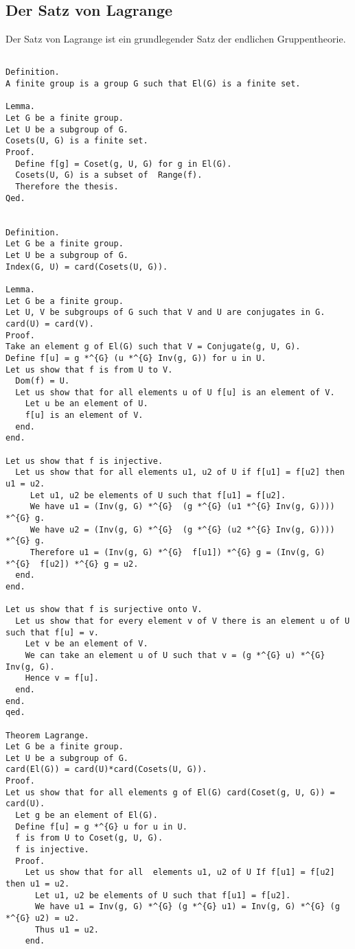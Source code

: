 \documentclass[a4paper,12pt]{scrartcl}
\begin{document}
\subsection{Der Satz von Lagrange}

Der Satz von Lagrange ist ein grundlegender Satz der endlichen Gruppentheorie.

\begin{lstlisting}

Definition.
A finite group is a group G such that El(G) is a finite set.

Lemma.
Let G be a finite group.
Let U be a subgroup of G.
Cosets(U, G) is a finite set.
Proof.
  Define f[g] = Coset(g, U, G) for g in El(G).
  Cosets(U, G) is a subset of  Range(f).
  Therefore the thesis.
Qed.


Definition.
Let G be a finite group.
Let U be a subgroup of G.
Index(G, U) = card(Cosets(U, G)).

Lemma.
Let G be a finite group.
Let U, V be subgroups of G such that V and U are conjugates in G.
card(U) = card(V).
Proof.
Take an element g of El(G) such that V = Conjugate(g, U, G).
Define f[u] = g *^{G} (u *^{G} Inv(g, G)) for u in U.
Let us show that f is from U to V.
  Dom(f) = U.
  Let us show that for all elements u of U f[u] is an element of V.
    Let u be an element of U.
    f[u] is an element of V.
  end.
end.

Let us show that f is injective.
  Let us show that for all elements u1, u2 of U if f[u1] = f[u2] then u1 = u2.
     Let u1, u2 be elements of U such that f[u1] = f[u2].
     We have u1 = (Inv(g, G) *^{G}  (g *^{G} (u1 *^{G} Inv(g, G)))) *^{G} g.
     We have u2 = (Inv(g, G) *^{G}  (g *^{G} (u2 *^{G} Inv(g, G)))) *^{G} g.
     Therefore u1 = (Inv(g, G) *^{G}  f[u1]) *^{G} g = (Inv(g, G) *^{G}  f[u2]) *^{G} g = u2.
  end.
end.

Let us show that f is surjective onto V.
  Let us show that for every element v of V there is an element u of U such that f[u] = v.
    Let v be an element of V.
    We can take an element u of U such that v = (g *^{G} u) *^{G} Inv(g, G).
    Hence v = f[u].
  end.
end.
qed.

Theorem Lagrange.
Let G be a finite group.
Let U be a subgroup of G.
card(El(G)) = card(U)*card(Cosets(U, G)).
Proof.
Let us show that for all elements g of El(G) card(Coset(g, U, G)) = card(U).
  Let g be an element of El(G).
  Define f[u] = g *^{G} u for u in U.
  f is from U to Coset(g, U, G).
  f is injective.
  Proof.
    Let us show that for all  elements u1, u2 of U If f[u1] = f[u2] then u1 = u2.
      Let u1, u2 be elements of U such that f[u1] = f[u2].
      We have u1 = Inv(g, G) *^{G} (g *^{G} u1) = Inv(g, G) *^{G} (g *^{G} u2) = u2.
      Thus u1 = u2.
    end.


\end{lstlisting}
\end{document}

